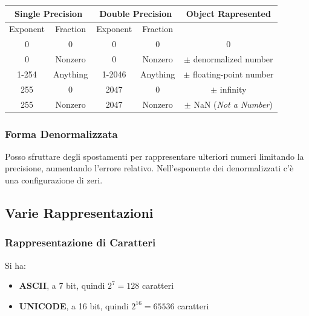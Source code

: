 \documentclass[a4paper,12pt, oneside]{book}
\begin{document}
\begin{center}
	\begin{tabular}{c|c|c|c|c}
		\multicolumn{2}{c}{Single Precision} & \multicolumn{2}{c}{Double Precision} & Object Rapresented                                                \\ \hline
		Exponent                             & Fraction                             & Exponent           & Fraction                                     \\ \hline
		0                                    & 0                                    & 0                  & 0        & 0                                 \\ \hline
		0                                    & Nonzero                              & 0                  & Nonzero  & $\pm$ denormalized number         \\ \hline
		1-254                                & Anything                             & 1-2046             & Anything & $\pm$ floating-point number       \\ \hline
		255                                  & 0                                    & 2047               & 0        & $\pm$ infinity                    \\ \hline
		255                                  & Nonzero                              & 2047               & Nonzero  & $\pm$ NaN (\textit{Not a Number}) \\ \hline
	\end{tabular}
\end{center}
\subsubsection{Forma Denormalizzata}
Posso sfruttare degli spostamenti per rappresentare ulteriori numeri limitando la precisione, aumentando l'errore relativo. Nell'esponente dei denormalizzati c'è una configurazione di zeri.
\subsection{Varie Rappresentazioni}
\subsubsection{Rappresentazione di Caratteri}
Si ha:
\begin{itemize}
	\item \textbf{ASCII}, a 7 bit, quindi $2^7=128$ caratteri
	\item \textbf{UNICODE}, a 16 bit, quindi $2^{16}=65536$ caratteri
\end{itemize}
\end{document}

